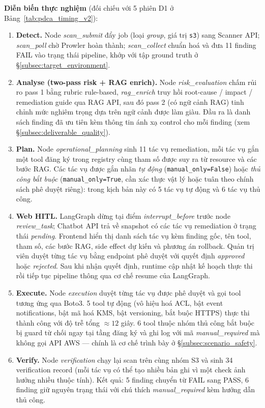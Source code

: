 \textbf{Diễn biến thực nghiệm} (đối chiếu với 5 phiên D1 ở Bảng~\ref{tab:pdca_timing_v2}):
\begin{enumerate}
  \item \textbf{Detect.} Node \textit{scan\_submit} đẩy job (loại \emph{group}, giá trị \texttt{s3}) sang Scanner API; \textit{scan\_poll} chờ Prowler hoàn thành; \textit{scan\_collect} chuẩn hoá và đưa 11 finding FAIL vào trạng thái pipeline, khớp với tập ground truth ở \S\ref{subsec:target_environment}.
  \item \textbf{Analyse (two-pass risk + RAG enrich).} Node \textit{risk\_evaluation} chấm rủi ro pass 1 bằng rubric rule-based, \textit{rag\_enrich} truy hồi root-cause / impact / remediation guide qua RAG API, sau đó pass 2 (có ngữ cảnh RAG) tinh chỉnh mức nghiêm trọng dựa trên ngữ cảnh được làm giàu. Đầu ra là danh sách finding đã ưu tiên kèm thông tin ánh xạ control cho mỗi finding (xem \S\ref{subsec:deliverable_quality}).
  \item \textbf{Plan.} Node \textit{operational\_planning} sinh 11 tác vụ remediation, mỗi tác vụ gắn một tool đăng ký trong registry cùng tham số được suy ra từ resource và các bước RAG. Các tác vụ được gắn nhãn \emph{tự động} (\texttt{manual\_only=False}) hoặc \emph{thủ công bắt buộc} (\texttt{manual\_only=True}, cần xác thực vật lý hoặc tuân theo chính sách phê duyệt riêng): trong kịch bản này có 5 tác vụ tự động và 6 tác vụ thủ công.
  \item \textbf{Web HITL.} LangGraph dừng tại điểm \emph{interrupt\_before} trước node \textit{review\_task}; Chatbot API trả về snapshot có các tác vụ remediation ở trạng thái \emph{pending}. Frontend hiển thị danh sách tác vụ kèm finding gốc, tên tool, tham số, các bước RAG, side effect dự kiến và phương án rollback. Quản trị viên duyệt từng tác vụ bằng endpoint phê duyệt với quyết định \emph{approved} hoặc \emph{rejected}. Sau khi nhận quyết định, runtime cập nhật kế hoạch thực thi rồi tiếp tục pipeline thông qua cơ chế resume của LangGraph.
  \item \textbf{Execute.} Node \textit{execution} duyệt từng tác vụ được phê duyệt và gọi tool tương ứng qua Boto3. 5 tool tự động (vô hiệu hoá ACL, bật event notifications, bật mã hoá KMS, bật versioning, bắt buộc HTTPS) thực thi thành công với độ trễ tổng $\approx 12$ giây. 6 tool thuộc nhóm thủ công bắt buộc bị guard từ chối ngay tại tầng đăng ký và ghi log với mã \textit{manual\_required} mà không gọi API AWS --- chính là cơ chế trình bày ở \S\ref{subsec:scenario_safety}.
  \item \textbf{Verify.} Node \textit{verification} chạy lại scan trên cùng nhóm S3 và sinh 34 verification record (mỗi tác vụ có thể tạo nhiều bản ghi vì một check ảnh hưởng nhiều thuộc tính). Kết quả: 5 finding chuyển từ FAIL sang PASS, 6 finding giữ nguyên trạng thái với chú thích \textit{manual\_required} kèm hướng dẫn thủ công.

\end{enumerate}
